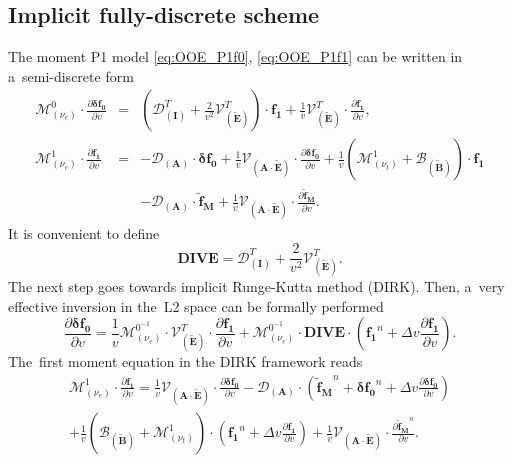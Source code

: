 \documentclass[preprint,12pt]{elsarticle}
\newcommand{\pdv}[2]{\frac{\partial{#1}}{\partial{#2}}}
\newcommand{\vect}[1]{\boldsymbol{#1}}
\newcommand{\matr}[1]{\mathbf{#1}}
\newcommand{\nue}{\nu_{e}}
\newcommand{\nutot}{\nu_{t}}
\newcommand{\vmag}{v}
\newcommand{\tE}{\vect{\tilde{E}}}
\newcommand{\tB}{\vect{\tilde{B}}}
\newcommand{\tvfM}{\vect{\tilde{f}_M}}
\newcommand{\davfzero}{\vect{\delta f_0}}
\newcommand{\fone}{\vect{f_1}}
\newcommand{\MI}{\matr{I}}
\newcommand{\MA}{\matr{A}}
\newcommand{\IM}{\boldsymbol{\mathcal{M}}}
\newcommand{\ID}{\boldsymbol{\mathcal{D}}}
\newcommand{\IV}{\boldsymbol{\mathcal{V}}}
\newcommand{\IB}{\boldsymbol{\mathcal{B}}}
\begin{document}
\subsection{Implicit fully-discrete scheme}
\label{sec:OOE_impl_fullydiscrete_scheme}
The moment P1 model \eqref{eq:OOE_P1f0}, \eqref{eq:OOE_P1f1} can be written 
in a~semi-discrete form
\begin{eqnarray}
  \IM^0_{(\nue)} \cdot \pdv{\davfzero}{\vmag}  
  &=& 
  \left(\ID^T_{\left(\MI\right)}
  + \frac{2}{\vmag^2}\IV^T_{\left(\tE\right)}\right) \cdot \fone
  + \frac{1}{\vmag}\IV^T_{\left(\tE\right)} \cdot 
  \pdv{\fone}{\vmag} ,  
  \nonumber \label{eq:OOE_semiM1hosf0} \\
  \IM^1_{(\nue)} \cdot \pdv{\fone}{\vmag}  
  &=& 
  - \ID_{\left(\MA\right)}\cdot\davfzero
  + \frac{1}{\vmag}\IV_{\left(\MA \cdot \tE\right)} \cdot
  \pdv{\davfzero}{\vmag}
  + \frac{1}{\vmag}\left(
  \IM^1_{\left( \nutot \right)} + \IB_{\left( \tB \right)}  
  \right) \cdot \fone
  \nonumber\\
  & & - \ID_{\left(\MA\right)}\cdot \tvfM
  + \frac{1}{\vmag}\IV_{\left(\MA \cdot \tE\right)} \cdot
  \pdv{\tvfM}{\vmag} .
  \label{eq:OOE_semiM1hosf1}
\end{eqnarray}
It is convenient to define
\begin{equation}
  \matr{DIVE} = \ID^T_{\left(\MI\right)} 
  + \frac{2}{\vmag^2}\IV^T_{\left(\tE\right)}.
  \nonumber
\end{equation}
The next step goes towards implicit Runge-Kutta method (DIRK).
Then, a~very effective inversion in the~L2 space can be formally performed
\begin{equation}
  \pdv{\davfzero}{\vmag}  
  = \frac{1}{\vmag}
  \IM^{0^{-1}}_{(\nue)} \cdot \IV^T_{\left(\tE\right)} \cdot 
  \pdv{\fone}{\vmag} 
  + \IM^{0^{-1}}_{(\nue)} \cdot \matr{DIVE}\cdot  
  \left(\fone^n 
  + \Delta\vmag\pdv{\fone}{\vmag}\right) .
  \label{eq:OOE_fullP1hosf0}
\end{equation}
The~first moment equation in the DIRK framework reads
\begin{multline}
  \IM^1_{(\nue)} \cdot \pdv{\fone}{\vmag}  
  = \frac{1}{\vmag}\IV_{\left(\MA \cdot \tE\right)} \cdot
  \pdv{\davfzero}{\vmag}
  - \ID_{\left(\MA\right)}\cdot \left(\tvfM^n + \davfzero^n 
  + \Delta\vmag\pdv{\davfzero}{\vmag}\right)\\ 
  + \frac{1}{\vmag}\left(\IB_{\left( \tB \right)} 
  + \IM^1_{\left( \nutot \right)}\right) 
  \cdot \left(\fone^n 
  + \Delta\vmag\pdv{\fone}{\vmag}\right)
  + \frac{1}{\vmag}\IV_{\left(\MA \cdot \tE\right)} \cdot
  \pdv{\tvfM^n}{\vmag} .
  \label{eq:OOE_semiM1hosf1}
\end{multline}
\end{document}
